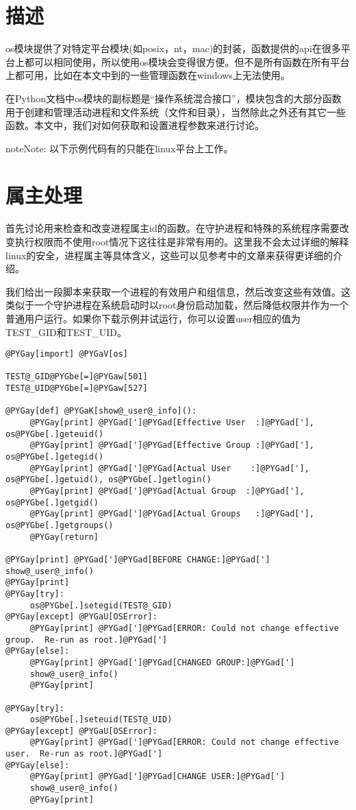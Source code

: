 \documentclass[a4paper,10pt,english]{manual}
\begin{document}
\section{描述}

os模块提供了对特定平台模块(如posix，nt，mac)的封装，函数提供的api在很多平台上都可以相同使用，所以使用os模块会变得很方便。但不是所有函数在所有平台上都可用，比如在本文中到的一些管理函数在windows上无法使用。

在Python文档中os模块的副标题是“操作系统混合接口”，模块包含的大部分函数用于创建和管理活动进程和文件系统（文件和目录），当然除此之外还有其它一些函数。本文中，我们对如何获取和设置进程参数来进行讨论。

\begin{notice}{note}{Note:}
以下示例代码有的只能在linux平台上工作。
\end{notice}


\section{属主处理}

首先讨论用来检查和改变进程属主id的函数。在守护进程和特殊的系统程序需要改变执行权限而不使用root情况下这往往是非常有用的。这里我不会太过详细的解释linux的安全，进程属主等具体含义，这些可以见参考中的文章来获得更详细的介绍。

我们给出一段脚本来获取一个进程的有效用户和组信息，然后改变这些有效值。这类似于一个守护进程在系统启动时以root身份启动加载，然后降低权限并作为一个普通用户运行。如果你下载示例并试运行，你可以设置user相应的值为TEST\_GID和TEST\_UID。

\begin{Verbatim}[commandchars=@\[\]]
@PYGay[import] @PYGaV[os]

TEST@_GID@PYGbe[=]@PYGaw[501]
TEST@_UID@PYGbe[=]@PYGaw[527]

@PYGay[def] @PYGaK[show@_user@_info]():
     @PYGay[print] @PYGad[']@PYGad[Effective User  :]@PYGad['], os@PYGbe[.]geteuid()
     @PYGay[print] @PYGad[']@PYGad[Effective Group :]@PYGad['], os@PYGbe[.]getegid()
     @PYGay[print] @PYGad[']@PYGad[Actual User    :]@PYGad['], os@PYGbe[.]getuid(), os@PYGbe[.]getlogin()
     @PYGay[print] @PYGad[']@PYGad[Actual Group  :]@PYGad['], os@PYGbe[.]getgid()
     @PYGay[print] @PYGad[']@PYGad[Actual Groups   :]@PYGad['], os@PYGbe[.]getgroups()
     @PYGay[return]

@PYGay[print] @PYGad[']@PYGad[BEFORE CHANGE:]@PYGad[']
show@_user@_info()
@PYGay[print]
@PYGay[try]:
     os@PYGbe[.]setegid(TEST@_GID)
@PYGay[except] @PYGaU[OSError]:
     @PYGay[print] @PYGad[']@PYGad[ERROR: Could not change effective group.  Re-run as root.]@PYGad[']
@PYGay[else]:
     @PYGay[print] @PYGad[']@PYGad[CHANGED GROUP:]@PYGad[']
     show@_user@_info()
     @PYGay[print]

@PYGay[try]:
     os@PYGbe[.]seteuid(TEST@_UID)
@PYGay[except] @PYGaU[OSError]:
     @PYGay[print] @PYGad[']@PYGad[ERROR: Could not change effective user.  Re-run as root.]@PYGad[']
@PYGay[else]:
     @PYGay[print] @PYGad[']@PYGad[CHANGE USER:]@PYGad[']
     show@_user@_info()
     @PYGay[print]
\end{Verbatim}
\end{document}
